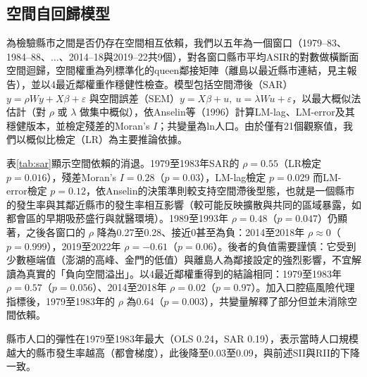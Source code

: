 \documentclass[UTF8,a4paper,11pt]{ctexart}
\begin{document}
\subsection{空間自回歸模型}
為檢驗縣市之間是否仍存在空間相互依賴，我們以五年為一個窗口（1979--83、1984--88、$\dots$、2014--18與2019--22共9個），對各窗口縣市平均ASIR的對數做橫斷面空間迴歸，空間權重為列標準化的queen鄰接矩陣（離島以最近縣市連結，見主報告），並以4最近鄰權重作穩健性檢查。模型包括空間滯後（SAR）$y=\rho Wy+X\beta+\varepsilon$ 與空間誤差（SEM）$y=X\beta+u,\ u=\lambda Wu+\varepsilon$，以最大概似法估計（對 $\rho$ 或 $\lambda$ 做集中概似），依Anselin等（1996）計算LM-lag、LM-error及其穩健版本，並檢定殘差的Moran's $I$；共變量為ln人口。由於僅有21個觀察值，我們以概似比檢定（LR）為主要推論依據。

表\ref{tab:sar}顯示空間依賴的消退。1979至1983年SAR的 $\rho=0.55$（LR檢定 $p=0.016$），殘差Moran's $I=0.28$（$p=0.03$），LM-lag檢定 $p=0.029$ 而LM-error檢定 $p=0.12$，依Anselin的決策準則較支持空間滯後型態，也就是一個縣市的發生率與其鄰近縣市的發生率相互影響（較可能反映擴散與共同的區域暴露，如都會區的早期吸菸盛行與就醫環境）。1989至1993年 $\rho=0.48$（$p=0.047$）仍顯著，之後各窗口的 $\rho$ 降為0.27至0.28、接近0甚至為負：2014至2018年 $\rho\approx 0$（$p=0.999$），2019至2022年 $\rho=-0.61$（$p=0.06$）。後者的負值需要謹慎：它受到少數極端值（澎湖的高峰、金門的低值）與離島人為鄰接設定的強烈影響，不宜解讀為真實的「負向空間溢出」。以4最近鄰權重得到的結論相同：1979至1983年 $\rho=0.57$（$p=0.056$）、2014至2018年 $\rho=0.02$（$p=0.97$）。加入口腔癌風險代理指標後，1979至1983年的 $\rho$ 為0.64（$p=0.003$），共變量解釋了部分但並未消除空間依賴。

縣市人口的彈性在1979至1983年最大（OLS 0.24，SAR 0.19），表示當時人口規模越大的縣市發生率越高（都會梯度），此後降至0.03至0.09，與前述SII與RII的下降一致。
\end{document}
